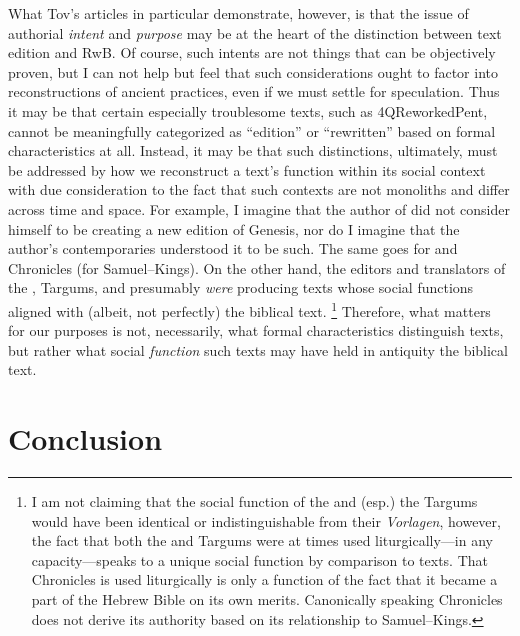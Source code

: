 What Tov's articles in particular demonstrate, however, is that the issue of authorial \emph{intent} and \emph{purpose} may be at the heart of the distinction between text edition and RwB. Of course, such intents are not things that can be objectively proven, but I can not help but feel that such considerations ought to factor into reconstructions of ancient practices, even if we must settle for speculation. Thus it may be that certain especially troublesome texts, such as 4QReworkedPent, cannot be meaningfully categorized as ``edition'' or ``rewritten'' based on formal characteristics at all. Instead, it may be that such distinctions, ultimately, must be addressed by how we reconstruct a text's function within its social context with due consideration to the fact that such contexts are not monoliths and differ across time and space. For example, I imagine that the author of \ga did not consider himself to be creating a new edition of Genesis, nor do I imagine that the author's contemporaries understood it to be such. The same goes for \jub and Chronicles (for Samuel--Kings). On the other hand, the editors and translators of the \sampent, Targums, and \lxx presumably \emph{were} producing texts whose social functions aligned with (albeit, not perfectly) the biblical text.%
    \footnote{I am not claiming that the social function of the \lxx and (esp.) the Targums would have been identical or indistinguishable from their \emph{Vorlagen}, however, the fact that both the \lxx and Targums were at times used liturgically---in any capacity---speaks to a unique social function by comparison to \rwb texts. That Chronicles is used liturgically is only a function of the fact that it became a part of the Hebrew Bible on its own merits. Canonically speaking Chronicles does not derive its authority based on its relationship to Samuel--Kings.}
%
Therefore, what matters for our purposes is not, necessarily, what formal characteristics distinguish \rwb texts, but rather what social \emph{function} such texts may have held in antiquity \visavis the biblical text.

\section{Conclusion}


